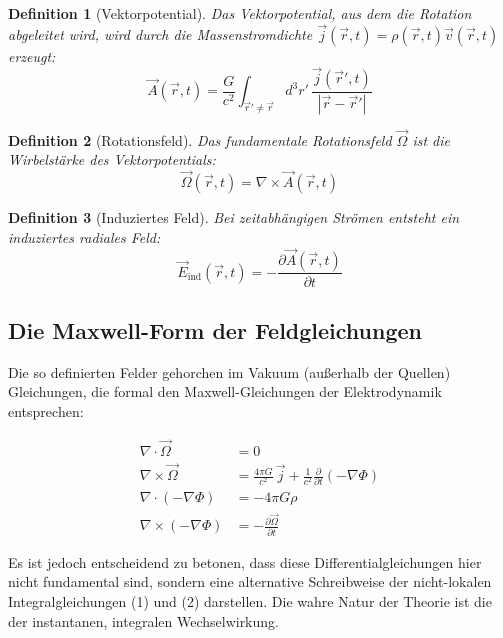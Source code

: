 \documentclass[12pt,a4paper]{article}
\newtheorem{definition}{Definition}
\begin{document}
\begin{definition}[Vektorpotential]
Das Vektorpotential, aus dem die Rotation abgeleitet wird, wird durch die Massenstromdichte $\vec{j}(\vec{r}, t) = \rho(\vec{r}, t) \vec{v}(\vec{r}, t)$ erzeugt:
\begin{equation}
\boxed{ \vec{A}(\vec{r}, t) = \frac{G}{c^2} \int_{\vec{r}' \neq \vec{r}} d^3r' \, \frac{\vec{j}(\vec{r}', t)}{|\vec{r} - \vec{r}'|} }
\end{equation}
\end{definition}

\begin{definition}[Rotationsfeld]
Das fundamentale Rotationsfeld $\vec{\Omega}$ ist die Wirbelstärke des Vektorpotentials:
\begin{equation}
\boxed{ \vec{\Omega}(\vec{r}, t) = \nabla \times \vec{A}(\vec{r}, t) }
\end{equation}
\end{definition}

\begin{definition}[Induziertes Feld]
Bei zeitabhängigen Strömen entsteht ein induziertes radiales Feld:
\begin{equation}
\boxed{ \vec{E}_{\text{ind}}(\vec{r}, t) = -\frac{\partial \vec{A}(\vec{r}, t)}{\partial t} }
\end{equation}
\end{definition}

\subsection{Die Maxwell-Form der Feldgleichungen}

Die so definierten Felder gehorchen im Vakuum (außerhalb der Quellen) Gleichungen, die formal den Maxwell-Gleichungen der Elektrodynamik entsprechen:

\begin{align}
\nabla \cdot \vec{\Omega} &= 0 \label{eq:max1} \\
\nabla \times \vec{\Omega} &= \frac{4\pi G}{c^2} \, \vec{j} + \frac{1}{c^2} \frac{\partial}{\partial t} (-\nabla \Phi) \label{eq:max2} \\
\nabla \cdot (-\nabla \Phi) &= -4\pi G \rho \label{eq:max3} \\
\nabla \times (-\nabla \Phi) &= -\frac{\partial \vec{\Omega}}{\partial t} \label{eq:max4}
\end{align}

Es ist jedoch entscheidend zu betonen, dass diese Differentialgleichungen hier nicht fundamental sind, sondern eine alternative Schreibweise der nicht-lokalen Integralgleichungen (1) und (2) darstellen. Die wahre Natur der Theorie ist die der instantanen, integralen Wechselwirkung.
\end{document}
